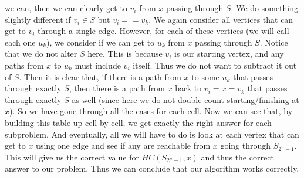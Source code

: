 \documentclass{article}
\begin{document}
we can, then we can clearly get to $v_i$ from $x$ passing through $S$. We do
something slightly different if $v_i \in S$ but $v_i == v_k$. We again consider
all vertices that can get to $v_i$ through a single edge. However, for each of
these vertices (we will call each one $u_k$),
we consider if we can get to $u_k$ from $x$ passing through $S$.
Notice that we do not alter $S$ here. This is because $v_i$ is our starting
vertex, and any paths from $x$ to $u_k$ must include $v_i$ itself. Thus we do
not want to subtract it out of $S$. Then it is clear that, if there is a path
from $x$ to some $u_k$ that passes through exactly $S$, then there is a path
from $x$ back to $v_i=x=v_k$ that passes through exactly $S$ as well (since here we
do not double count starting/finishing at $x$). So we have gone through all the
cases for each cell. Now we can see that, by building this table up cell by
cell, we get exactly the right answer for each subproblem. And eventually, all
we will have to do is look at each vertex that can get to $x$ using one edge and
see if any are reachable from $x$ going through $S_{2^n - 1}$. This will give us
the correct value for $HC(S_{2^n - 1}, x)$ and thus the correct answer to our
problem. Thus we can conclude that our algorithm works correctly.
\newpage
\end{document}

